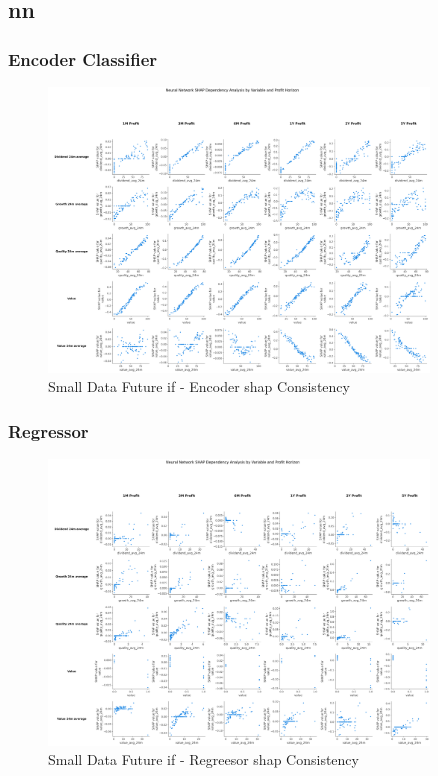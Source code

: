 \documentclass[11pt,english,a4paper,hidelinks]{book}
\begin{document}
\subsection{\acrshort{nn}}

\subsubsection{Encoder Classifier}
\begin{figure}[H]
    \centering
    \includegraphics[width=0.9\textwidth]{images/code/models/neural_network/binary_classifier_nn/Small Data future - IF/shap_table_analysis.png}
    \caption{Small Data Future \acrshort{if} - Encoder \gls{shap} Consistency}
    \label{fig:small_encoder_shap_consistency}
\end{figure}

\subsubsection{Regressor}
\begin{figure}[H]
    \centering
    \includegraphics[width=0.9\textwidth]{images/code/models/neural_network/regressor_nn/Small Data future - Multi 2/shap_table_analysis.png}
    \caption{Small Data Future \acrshort{if} - Regreesor \gls{shap} Consistency}
    \label{fig:regressor_small_binary_shap_consistency}
\end{figure}
\end{document}

